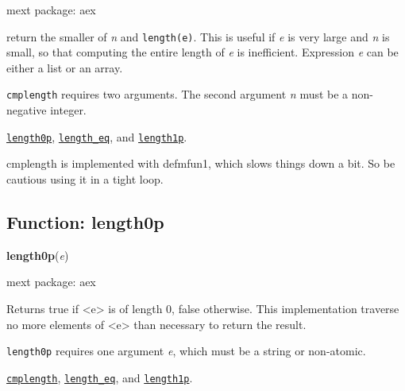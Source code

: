 \documentclass[]{article}
\begin{document}
\noindent mext package: aex



\vspace{5 pt}
return the smaller of {\it n} and \verb#length(e)#. This is useful if {\it e} is very large and {\it n} is small, so that computing the entire length of {\it e} is inefficient. Expression {\it e} can be either a list or an array. 

\vspace{5 pt}

   {\tt cmplength} requires two arguments.
    The second argument {\it n} must be a non-negative integer.


\vspace{5 pt}


  \hyperlink{length0p}{{\tt length0p}}, \hyperlink{length_eq}{{\tt length\_eq}}, and \hyperlink{length1p}{{\tt length1p}}.

\vspace{5 pt}


cmplength is implemented with defmfun1, which slows things down a bit. So be cautious using it in a tight loop. 

\vspace{5 pt}


\subsection{Function: length0p\label{sec:length0p}}
\hypertarget{length0p}{}
{\bf length0p}({\it e})


\noindent mext package: aex



\vspace{5 pt}
Returns true if <e> is of length 0, false otherwise. This implementation traverse no more elements of <e> than necessary to return the result. 

\vspace{5 pt}

   {\tt length0p} requires one argument {\it e}, which must be a string or non-atomic.


\vspace{5 pt}


  \hyperlink{cmplength}{{\tt cmplength}}, \hyperlink{length_eq}{{\tt length\_eq}}, and \hyperlink{length1p}{{\tt length1p}}.
\end{document}
